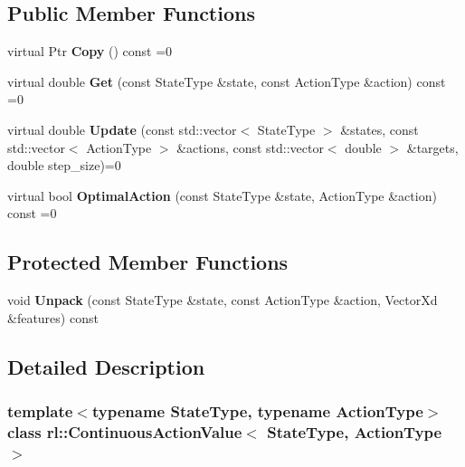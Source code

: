 \subsection*{Public Member Functions}
\begin{DoxyCompactItemize}
\item 
\hypertarget{classrl_1_1_continuous_action_value_a211d1af3c70b2b3567a7e7a41751522e}{}\label{classrl_1_1_continuous_action_value_a211d1af3c70b2b3567a7e7a41751522e} 
virtual Ptr {\bfseries Copy} () const =0
\item 
\hypertarget{classrl_1_1_continuous_action_value_aa3f772e32730a219738e4fae4ef042a4}{}\label{classrl_1_1_continuous_action_value_aa3f772e32730a219738e4fae4ef042a4} 
virtual double {\bfseries Get} (const State\+Type \&state, const Action\+Type \&action) const =0
\item 
\hypertarget{classrl_1_1_continuous_action_value_a5ceb3561af43ed0e48897083ca856452}{}\label{classrl_1_1_continuous_action_value_a5ceb3561af43ed0e48897083ca856452} 
virtual double {\bfseries Update} (const std\+::vector$<$ State\+Type $>$ \&states, const std\+::vector$<$ Action\+Type $>$ \&actions, const std\+::vector$<$ double $>$ \&targets, double step\+\_\+size)=0
\item 
\hypertarget{classrl_1_1_continuous_action_value_a070636438e4c111f1b3fe215f455dcd6}{}\label{classrl_1_1_continuous_action_value_a070636438e4c111f1b3fe215f455dcd6} 
virtual bool {\bfseries Optimal\+Action} (const State\+Type \&state, Action\+Type \&action) const =0
\end{DoxyCompactItemize}
\subsection*{Protected Member Functions}
\begin{DoxyCompactItemize}
\item 
\hypertarget{classrl_1_1_continuous_action_value_aa35b3c3850fbb1045cc497b847e68f50}{}\label{classrl_1_1_continuous_action_value_aa35b3c3850fbb1045cc497b847e68f50} 
void {\bfseries Unpack} (const State\+Type \&state, const Action\+Type \&action, Vector\+Xd \&features) const
\end{DoxyCompactItemize}


\subsection{Detailed Description}
\subsubsection*{template$<$typename State\+Type, typename Action\+Type$>$\newline
class rl\+::\+Continuous\+Action\+Value$<$ State\+Type, Action\+Type $>$}



